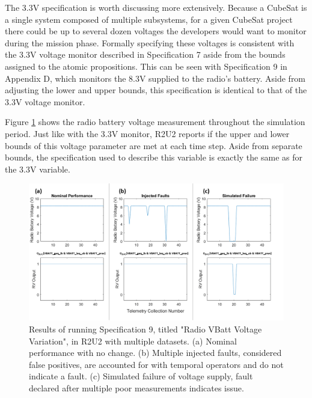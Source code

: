 \documentclass[conf]{new-aiaa}
\begin{document}
The 3.3V specification is worth discussing more extensively. Because a CubeSat is a single system composed of multiple subsystems, for a given CubeSat project there could be up to several dozen voltages the developers would want to monitor during the mission phase. Formally specifying these voltages is consistent with the 3.3V voltage monitor described in Specification 7 aside from the bounds assigned to the atomic propositions. This can be seen with Specification 9 in Appendix D, which monitors the 8.3V supplied to the radio's battery. Aside from adjusting the lower and upper bounds, this specification is identical to that of the 3.3V voltage monitor.

Figure \ref{VBATTSpecResults} shows the radio battery voltage measurement throughout the simulation period. Just like with the 3.3V monitor, R2U2 reports if the upper and lower bounds of this voltage parameter are met at each time step. Aside from separate bounds, the specification used to describe this variable is exactly the same as for the 3.3V variable.

\begin{figure}[!hb]
\centering
\includegraphics[width=.8\textwidth]{Fig/VBATT_Spec9.png}
\caption{Results of running Specification 9, titled "Radio VBatt Voltage Variation", in R2U2 with multiple datasets. (a) Nominal performance with no change. (b) Multiple injected faults, considered false positives, are accounted for with temporal operators and do not indicate a fault. (c) Simulated failure of voltage supply, fault declared after multiple poor measurements indicates issue.}
\label{VBATTSpecResults}
\end{figure}
\end{document}
